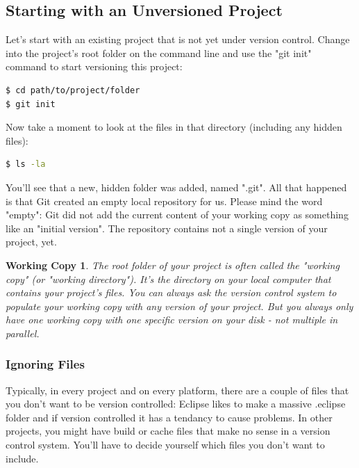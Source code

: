 \documentclass{article}
\begin{document}
\subsection{Starting with an Unversioned Project}

Let's start with an existing project that is not yet under version control. Change into the project's root folder on the command line and use the "git init" command to start versioning this project:

\begin{lstlisting}[language=bash]
$ cd path/to/project/folder
$ git init
\end{lstlisting}

Now take a moment to look at the files in that directory (including any hidden files):

\begin{lstlisting}[language=bash]
$ ls -la
\end{lstlisting}

You'll see that a new, hidden folder was added, named ".git". All that happened is that Git created an empty local repository for us. Please mind the word "empty": Git did not add the current content of your working copy as something like an "initial version". The repository contains not a single version of your project, yet.

 \newtheorem*{working-copy}{Working Copy}
 \begin{working-copy}
The root folder of your project is often called the "working copy" (or "working directory"). It's the directory on your local computer that contains your project's files.
\newline\newline
You can always ask the version control system to populate your working copy with any version of your project. But you always only have one working copy with one specific version on your disk - not multiple in parallel.
\end{working-copy}

\subsubsection{Ignoring Files}
Typically, in every project and on every platform, there are a couple of files that you don't want to be version controlled: Eclipse likes to make a massive .eclipse folder and if version controlled it has a tendancy to cause problems. In other projects, you might have build or cache files that make no sense in a version control system. You'll have to decide yourself which files you don't want to include.
\end{document}
